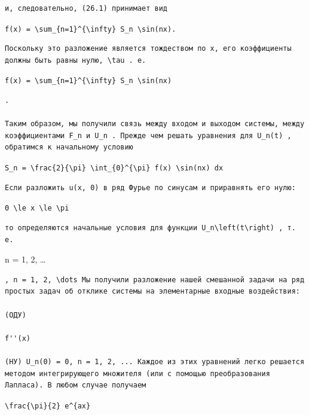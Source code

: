 \documentclass[
  ukrainian,
]{article}
\begin{document}
\begin{verbatim}
и, следовательно, (26.1) принимает вид
\end{verbatim}

\texttt{f(x)\ =\ \textbackslash{}sum\_\{n=1\}\^{}\{\textbackslash{}infty\}\ S\_n\ \textbackslash{}sin(nx).}

\begin{verbatim}
Поскольку это разложение является тождеством по x, его коэффициенты должны быть равны нулю, \tau . е.
\end{verbatim}

\texttt{f(x)\ =\ \textbackslash{}sum\_\{n=1\}\^{}\{\textbackslash{}infty\}\ S\_n\ \textbackslash{}sin(nx)}

\begin{verbatim}
.

Таким образом, мы получили связь между входом и выходом системы, между коэффициентами F_n и U_n . Прежде чем решать уравнения для U_n(t) , обратимся к начальному условию
\end{verbatim}

\texttt{S\_n\ =\ \textbackslash{}frac\{2\}\{\textbackslash{}pi\}\ \textbackslash{}int\_\{0\}\^{}\{\textbackslash{}pi\}\ f(x)\ \textbackslash{}sin(nx)\ dx}

\begin{verbatim}
Если разложить u(x, 0) в ряд Фурье по синусам и приравнять его нулю:
\end{verbatim}

\texttt{0\ \textbackslash{}le\ x\ \textbackslash{}le\ \textbackslash{}pi}

\begin{verbatim}
то определяются начальные условия для функции U_n\left(t\right) , т. е.
\end{verbatim}

n = 1, 2, \ldots{}

\begin{verbatim}
, n = 1, 2, \dots Мы получили разложение нашей смешанной задачи на ряд простых задач об отклике системы на элементарные входные воздействия:

(OДУ)

f''(x)

(HУ) U_n(0) = 0, n = 1, 2, ... Каждое из этих уравнений легко решается методом интегрирующего множителя (или с помощью преобразования Лапласа). В любом случае получаем
\end{verbatim}

\texttt{\textbackslash{}frac\{\textbackslash{}pi\}\{2\}\ e\^{}\{ax\}}
\end{document}
